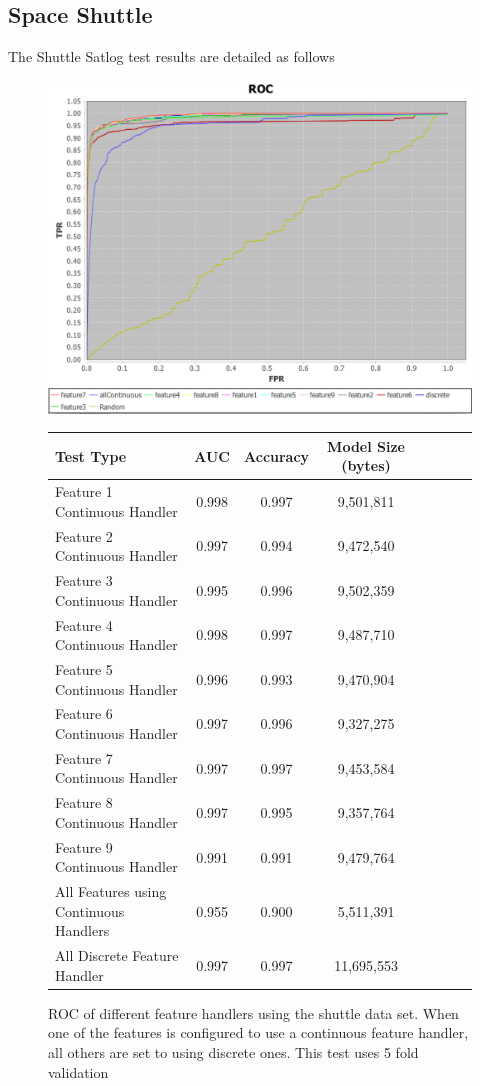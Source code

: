 \documentclass[a4paper,11pt]{scrreprt}
\begin{document}
\subsection{Space Shuttle}
The Shuttle Satlog test results are detailed as follows 
\begin{figure}[h!]
\centering
\caption{ROC of different feature handlers using the shuttle data set. When one of the features is configured to use a continuous feature handler, all others are set to using discrete ones. This test uses 5 fold validation}
\includegraphics[scale=0.55, trim=0 -25 0 2, clip=true] {features_shuttle.png}
\label{fig:indexes}
\begin{tabular}{l*{6}{c}r}
Test Type & AUC & Accuracy & Model Size (bytes)\\
\hline
Feature 1 Continuous Handler & 0.998 & 0.997 & 9,501,811\\
Feature 2 Continuous Handler & 0.997 & 0.994 & 9,472,540\\
Feature 3 Continuous Handler & 0.995 & 0.996 & 9,502,359\\
Feature 4 Continuous Handler & 0.998 & 0.997 & 9,487,710\\
Feature 5 Continuous Handler & 0.996 & 0.993 & 9,470,904\\
Feature 6 Continuous Handler & 0.997 & 0.996 & 9,327,275\\
Feature 7 Continuous Handler & 0.997 & 0.997 & 9,453,584\\
Feature 8 Continuous Handler & 0.997 & 0.995 & 9,357,764\\
Feature 9 Continuous Handler & 0.991 & 0.991 & 9,479,764\\
All Features using Continuous Handlers & 0.955 & 0.900 & 5,511,391\\
All Discrete Feature Handler & 0.997 & 0.997 & 11,695,553
\end{tabular}
\end{figure}
\clearpage
\end{document}
